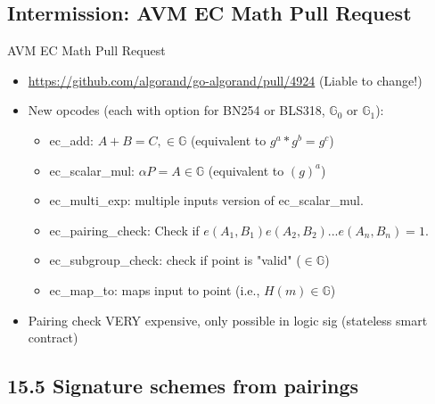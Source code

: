 \documentclass[aspectratio=169,xcolor=dvipsnames]{beamer}
\newcommand{\Go}{\mathbb{G}_0}
\newcommand{\Gi}{\mathbb{G}_1}
\begin{document}
\subsection{Intermission: AVM EC Math Pull Request}
\begin{frame}{AVM EC Math Pull Request}
\begin{itemize}
    \item \href{https://github.com/algorand/go-algorand/pull/4924}{https://github.com/algorand/go-algorand/pull/4924} (Liable to change!)
    \item New opcodes (each with option for BN254 or BLS318, $\Go$ or $\Gi$):
    \begin{itemize}
        \item ec\_add: $A + B = C, \in \mathbb{G}$ (equivalent to $g^a * g^b = g^c$)
        \item ec\_scalar\_mul: $\alpha P = A \in \mathbb{G}$ (equivalent to $(g)^a$)
        \item ec\_multi\_exp: multiple inputs version of ec\_scalar\_mul.
        \item ec\_pairing\_check: Check if $e(A_1, B_1)e(A_2, B_2)...e(A_n, B_n) = 1$.
        \item ec\_subgroup\_check: check if point is "valid" ($\in \mathbb{G}$)
        \item ec\_map\_to: maps input to point (i.e., $H(m) \in \mathbb{G}$)
    \end{itemize}
    \item Pairing check VERY expensive, only possible in logic sig (stateless smart contract)
\end{itemize}
    
\end{frame}

\subsection{15.5 Signature schemes from pairings}
\end{document}
